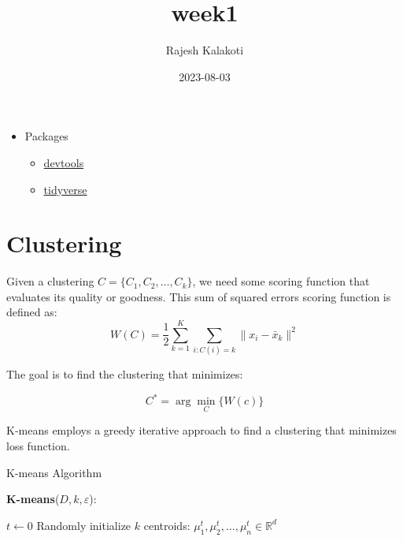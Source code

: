 \documentclass[
]{article}
\title{week1}
\author{Rajesh Kalakoti}
\date{2023-08-03}
\providecommand{\tightlist}{%
  \setlength{\itemsep}{0pt}\setlength{\parskip}{0pt}}
\begin{document}
\maketitle

\begin{itemize}
\tightlist
\item
  Packages

  \begin{itemize}
  \tightlist
  \item
    \href{https://www.r-project.org/nosvn/pandoc/devtools.html}{devtools}
  \item
    \href{https://www.tidyverse.org/packages/}{tidyverse}
  \end{itemize}
\end{itemize}

\hypertarget{clustering}{%
\section{Clustering}\label{clustering}}

Given a clustering \(C = \{C_1, C_2, \ldots, C_k\}\), we need some
scoring function that evaluates its quality or goodness. This sum of
squared errors scoring function is defined as:
\[ W(C) = \frac{1}{2} \sum_{k=1}^{K} \sum_{i: C(i)=k} \|x_i - \bar{x}_k\|^2 \]

The goal is to find the clustering that minimizes:

\[ C^* = \arg \min_C \{ W(c) \} \]

K-means employs a greedy iterative approach to find a clustering that
minimizes loss function.

\begin{algorithm}
\LinesNumbered %
\caption{K-means Algorithm}

\textbf{K-means}($D, k, \varepsilon$): {
  
  $t \leftarrow 0$\;
  Randomly initialize $k$ centroids: $\mu_{1}^{t}, \mu_{2}^{t}, \ldots, \mu_{n}^{t} \in \mathbb{R}^d$\;
}
\end{algorithm}
\end{document}
